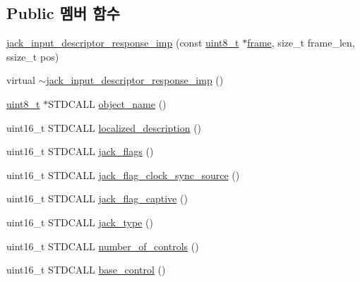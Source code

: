 \subsection*{Public 멤버 함수}
\begin{DoxyCompactItemize}
\item 
\hyperlink{classavdecc__lib_1_1jack__input__descriptor__response__imp_a747b27e84701bad4a4366642e9695dee}{jack\+\_\+input\+\_\+descriptor\+\_\+response\+\_\+imp} (const \hyperlink{stdint_8h_aba7bc1797add20fe3efdf37ced1182c5}{uint8\+\_\+t} $\ast$\hyperlink{gst__avb__playbin_8c_ac8e710e0b5e994c0545d75d69868c6f0}{frame}, size\+\_\+t frame\+\_\+len, ssize\+\_\+t pos)
\item 
virtual \hyperlink{classavdecc__lib_1_1jack__input__descriptor__response__imp_a583efcc5871c245a016fbbd6bb04e185}{$\sim$jack\+\_\+input\+\_\+descriptor\+\_\+response\+\_\+imp} ()
\item 
\hyperlink{stdint_8h_aba7bc1797add20fe3efdf37ced1182c5}{uint8\+\_\+t} $\ast$S\+T\+D\+C\+A\+LL \hyperlink{classavdecc__lib_1_1jack__input__descriptor__response__imp_a15837e3eb254ad44812cb766ae8cd53c}{object\+\_\+name} ()
\item 
uint16\+\_\+t S\+T\+D\+C\+A\+LL \hyperlink{classavdecc__lib_1_1jack__input__descriptor__response__imp_aa94307532fbb37e2f986fee8fec79373}{localized\+\_\+description} ()
\item 
uint16\+\_\+t S\+T\+D\+C\+A\+LL \hyperlink{classavdecc__lib_1_1jack__input__descriptor__response__imp_a948ec24f1eab1560f4b8d7a3cc284437}{jack\+\_\+flags} ()
\item 
uint16\+\_\+t S\+T\+D\+C\+A\+LL \hyperlink{classavdecc__lib_1_1jack__input__descriptor__response__imp_a93b4deb895be2840af94e63d9db174a0}{jack\+\_\+flag\+\_\+clock\+\_\+sync\+\_\+source} ()
\item 
uint16\+\_\+t S\+T\+D\+C\+A\+LL \hyperlink{classavdecc__lib_1_1jack__input__descriptor__response__imp_a8e8d981d8b9f1012c0a2f34e4208ecef}{jack\+\_\+flag\+\_\+captive} ()
\item 
uint16\+\_\+t S\+T\+D\+C\+A\+LL \hyperlink{classavdecc__lib_1_1jack__input__descriptor__response__imp_a4950216cf18021c8010f4691b0b67d45}{jack\+\_\+type} ()
\item 
uint16\+\_\+t S\+T\+D\+C\+A\+LL \hyperlink{classavdecc__lib_1_1jack__input__descriptor__response__imp_abdf54b1d2b03f5f2b7346ddc9d93df5c}{number\+\_\+of\+\_\+controls} ()
\item 
uint16\+\_\+t S\+T\+D\+C\+A\+LL \hyperlink{classavdecc__lib_1_1jack__input__descriptor__response__imp_a81a06cae8ad2431f6a3e067cc210aa98}{base\+\_\+control} ()
\end{DoxyCompactItemize}

